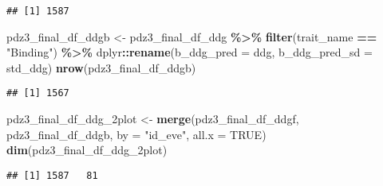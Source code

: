 \documentclass[
]{article}
\newenvironment{Shaded}{\begin{snugshade}}{\end{snugshade}}
\newcommand{\AttributeTok}[1]{\textcolor[rgb]{0.13,0.29,0.53}{#1}}
\newcommand{\ConstantTok}[1]{\textcolor[rgb]{0.56,0.35,0.01}{#1}}
\newcommand{\FunctionTok}[1]{\textcolor[rgb]{0.13,0.29,0.53}{\textbf{#1}}}
\newcommand{\NormalTok}[1]{#1}
\newcommand{\OtherTok}[1]{\textcolor[rgb]{0.56,0.35,0.01}{#1}}
\newcommand{\SpecialCharTok}[1]{\textcolor[rgb]{0.81,0.36,0.00}{\textbf{#1}}}
\newcommand{\StringTok}[1]{\textcolor[rgb]{0.31,0.60,0.02}{#1}}
\begin{document}
\begin{verbatim}
## [1] 1587
\end{verbatim}

\begin{Shaded}
\begin{Highlighting}[]
\NormalTok{pdz3\_final\_df\_ddgb }\OtherTok{\textless{}{-}}\NormalTok{ pdz3\_final\_df\_ddg }\SpecialCharTok{\%\textgreater{}\%} \FunctionTok{filter}\NormalTok{(trait\_name }\SpecialCharTok{==} \StringTok{"Binding"}\NormalTok{) }\SpecialCharTok{\%\textgreater{}\%} 
\NormalTok{  dplyr}\SpecialCharTok{::}\FunctionTok{rename}\NormalTok{(}\AttributeTok{b\_ddg\_pred =}\NormalTok{ ddg,}
                \AttributeTok{b\_ddg\_pred\_sd =}\NormalTok{ std\_ddg)}
\FunctionTok{nrow}\NormalTok{(pdz3\_final\_df\_ddgb)}
\end{Highlighting}
\end{Shaded}

\begin{verbatim}
## [1] 1567
\end{verbatim}

\begin{Shaded}
\begin{Highlighting}[]
\NormalTok{pdz3\_final\_df\_ddg\_2plot }\OtherTok{\textless{}{-}} \FunctionTok{merge}\NormalTok{(pdz3\_final\_df\_ddgf, pdz3\_final\_df\_ddgb, }\AttributeTok{by =} \StringTok{"id\_eve"}\NormalTok{, }\AttributeTok{all.x =} \ConstantTok{TRUE}\NormalTok{)}
\FunctionTok{dim}\NormalTok{(pdz3\_final\_df\_ddg\_2plot)}
\end{Highlighting}
\end{Shaded}

\begin{verbatim}
## [1] 1587   81
\end{verbatim}
\end{document}
